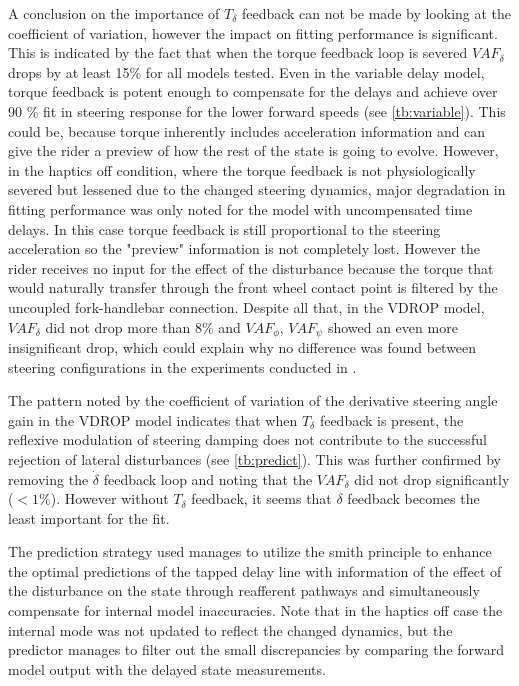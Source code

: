 A conclusion on the importance of \ensuremath{T_\delta} feedback can not be made by looking at the coefficient of variation, however the impact on fitting performance is significant. This is  indicated  by the fact that when the torque feedback loop is severed \ensuremath{\mathit{VAF}_\delta} drops by at least 15\% for all models tested. Even in the variable delay model, torque feedback is potent enough to compensate for the delays and achieve over 90 \% fit in steering response for the lower forward speeds (see \cref{tb:variable}). This could be, because torque inherently includes acceleration information and can give  the rider a preview of how the rest of the state is going to evolve. However, in the haptics off condition, where the torque feedback is not physiologically severed but lessened due to the changed steering dynamics,  major  degradation in fitting performance was only noted for the model with uncompensated time delays. In this case torque feedback is still proportional to the steering acceleration so the "preview" information is not completely lost. However the rider receives no input for the effect of the disturbance because the torque that would naturally transfer through the front wheel contact point is filtered by the uncoupled fork-handlebar connection.  Despite all that, in the VDROP model, \ensuremath{VAF_\delta} did not drop more than 8\% and \ensuremath{VAF_\phi}, \ensuremath{VAF_\psi} showed an even more insignificant drop, which could explain why no difference was found between steering configurations in the experiments conducted in \cite{dialynaseffect}. 

The pattern noted by the coefficient of variation of the derivative steering angle gain in the VDROP model indicates that when  \ensuremath{T_\delta} feedback  is present, the reflexive modulation of steering damping does not contribute to the successful rejection of lateral disturbances (see \cref{tb:predict}).  This was further confirmed by removing the \ensuremath{\dot{\delta}} feedback loop and noting that the \ensuremath{\mathit{VAF}_\delta} did not drop significantly (\ensuremath{< 1\%}). However without \ensuremath{T_\delta} feedback,  it seems that \ensuremath{{\delta}} feedback becomes the least important for the fit. 

The  prediction strategy used  manages to utilize the smith  principle to enhance the optimal  predictions of the tapped delay line with  information of the effect of the disturbance on the state through reafferent pathways and simultaneously compensate for internal model inaccuracies. Note that in the haptics off case the internal mode was not updated to reflect the changed dynamics, but the predictor manages to filter out the small discrepancies by comparing the forward model output with the delayed state measurements. 


